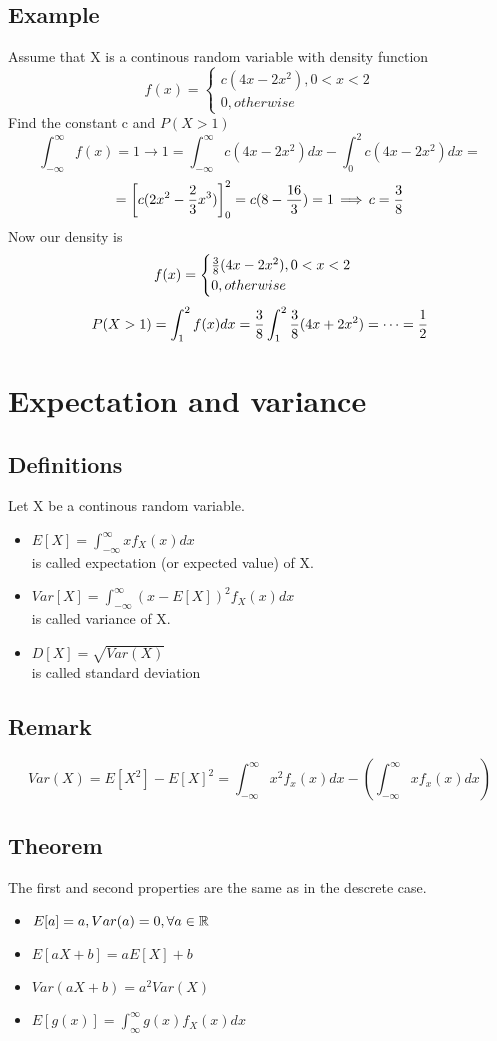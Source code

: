 \documentclass{article}
\begin{document}
\subsection{Example}
Assume that X is a continous random variable with density function
$$ f(x) =
  \begin{cases}
    c(4x-2x^2), 0<x<2\\
    0, otherwise
  \end{cases}
$$
Find the constant c and $P(X>1)$
$$ \int^\infty_{-\infty} f(x) = 1 \rightarrow 1 = \int^\infty_{-\infty} c(4x-2x^2)dx-\int^2_0c(4x-2x^2)dx =$$
$$= {\left[ c(2x^2 - \frac{2}{3} x^3) \right]}^2_0 = c(8-\frac{16}{3}) = 1 \operatorname{\implies} c = \frac{3}{8}  $$
Now our density is
$$ f(x) =
  \begin{cases}
    \frac{3}{8}(4x-2x^2), 0<x<2\\
    0, otherwise
  \end{cases}
$$
$$ P(X>1) = \int^2_1 f(x)dx =\frac{3}{8} \int^2_1 \frac{3}{8}(4x+2x^2) =\dots =\frac{1}{2}  $$

\section{Expectation and variance}
\subsection{Definitions}
Let X be a continous random variable.
\begin{itemize}
    \item $ E[X] = \int^{\infty}_{-\infty} xf_X(x)dx $ \\is called expectation (or expected value) of X.
    \item $ Var[X] = \int^{\infty}_{-\infty} (x-E[X])^2f_X(x)dx $ \\is called variance of X.
    \item $ D[X] = \sqrt{Var(X)} $ \\is called standard deviation
\end{itemize}

\subsection{Remark}
$$ Var(X) = E[X^2] - E[X]^2 = \int^\infty_{-\infty} x^2 f_x(x) dx - {\left( \int^\infty_{-\infty} xf_x(x)dx \right)}  $$

\subsection{Theorem}
The first and second properties are the same as in the descrete case.
\begin{itemize}
  \item $ E[a] = a, Var(a) = 0, \forall a \in {\mathbb R} $
  \item $ E[aX+b] = aE[X]+b$
  \item $Var(aX+b) = a^2Var(X)$
  \item $E[g(x)] = \int^\infty_{\infty} g(x)f_X(x)dx$
\end{itemize}
\end{document}
